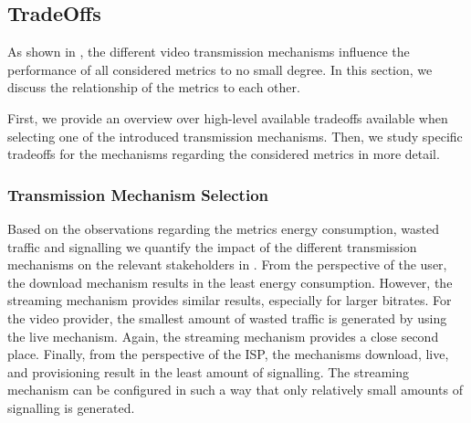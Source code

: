 \subsection{TradeOffs}\label{sec:application:lte_video:trade_offs}
As shown in , the different video transmission mechanisms influence the performance of all considered metrics to no small degree. 
In this section, we discuss the relationship of the metrics to each other.

First, we provide an overview over high-level available tradeoffs available when selecting one of the introduced transmission mechanisms.
Then, we study specific tradeoffs for the \streaming mechanisms regarding the considered metrics in more detail.


\subsubsection*{Transmission Mechanism Selection}\label{sec:application:lte_video:trade_offs:mechanism_selection}

Based on the observations regarding the metrics energy consumption, wasted traffic and signalling we quantify the impact of the different transmission mechanisms on the relevant stakeholders in .
From the perspective of the user, the download mechanism results in the least energy consumption.
However, the streaming mechanism provides similar results, especially for larger bitrates.
For the video provider, the smallest amount of wasted traffic is generated by using the live mechanism.
Again, the streaming mechanism provides a close second place.
Finally, from the perspective of the \gls{ISP}, the mechanisms download, live, and provisioning result in the least amount of signalling.
The streaming mechanism can be configured in such a way that only relatively small amounts of signalling is generated.

